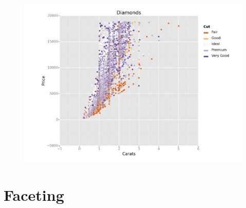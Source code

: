 \documentclass{beamer}
\begin{document}
\begin{frame}
	
	\begin{figure}
\centering
\includegraphics[width=1.1\linewidth]{aesthetic2}
\end{figure}

\end{frame}
\section{Faceting}
\end{document}
